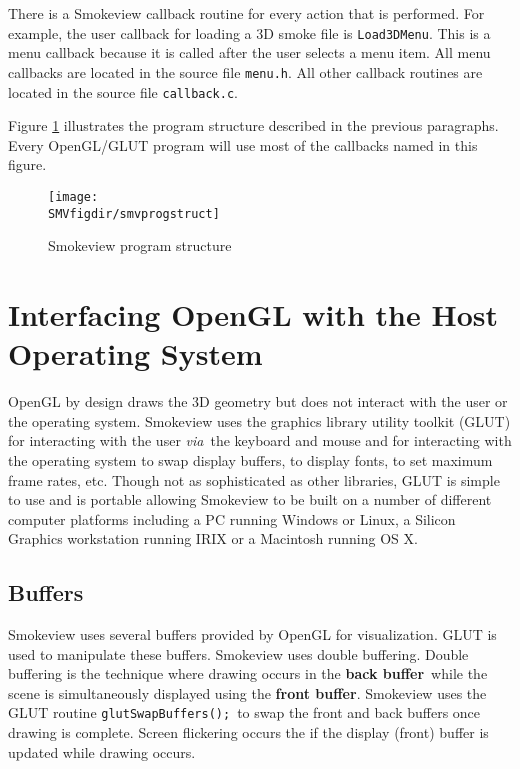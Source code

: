 \documentclass[11pt,twoside]{book}
\begin{document}
There is a Smokeview callback routine for every action that is
performed.  For example, the user callback for loading a 3D smoke
file is {\tt Load3DMenu}.  This is a menu callback because it is
called after the user selects a menu item.  All menu callbacks are
located in the source file {\tt menu.h}.  All other callback
routines are located in the source file {\tt callback.c}.

Figure \ref{figprogstruct} illustrates the program structure
described in the previous paragraphs.  Every OpenGL/GLUT program
will use most of the callbacks named in this figure.

\begin{figure}
\begin{center}
\texttt{[image: \\SMVfigdir/smvprogstruct]}
\end{center}
\caption{Smokeview program structure}
\label{figprogstruct}
\end{figure}

%
%

\chapter{Interfacing OpenGL with the Host Operating System}
\label{openglinterface}
OpenGL by design draws the 3D geometry but
does not interact with the user or the operating system. Smokeview
uses the graphics library utility toolkit (GLUT) for interacting
with the user {\em via}\ the keyboard and mouse and for
interacting with the operating system to swap display buffers, to
display fonts, to set maximum frame rates, etc. Though not as
sophisticated as other libraries, GLUT is simple to use and is
portable allowing Smokeview to be built on a number of different
computer platforms including a PC running Windows or Linux, a
Silicon Graphics workstation running IRIX or a Macintosh running
OS X.

%
%

\section{Buffers} Smokeview uses several buffers provided by
OpenGL for visualization.  GLUT is used to manipulate these
buffers. Smokeview uses double buffering.  Double buffering is the
technique where drawing occurs in the {\bf back buffer}\ while the
scene is simultaneously displayed using the {\bf front buffer}.
Smokeview uses the GLUT routine {\tt glutSwapBuffers();}\ to swap
the front and back buffers once drawing is complete. Screen
flickering occurs the if the display (front) buffer is updated
while drawing occurs.
\end{document}
